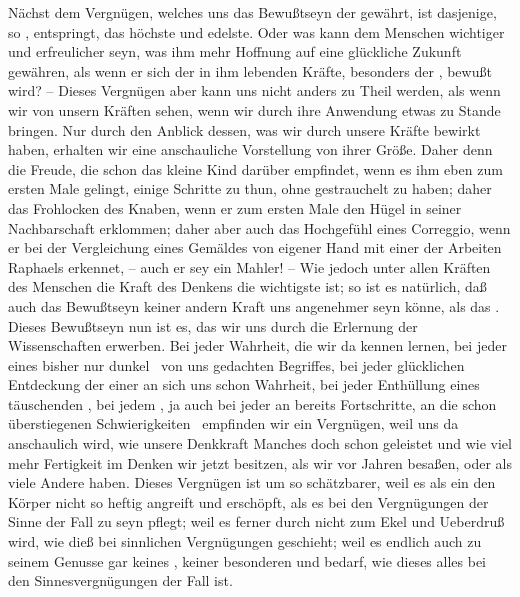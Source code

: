 \begin{aufza}
\begin{aufzb}
\item Nächst dem Vergnügen, welches uns das Bewußtseyn der  gewährt, ist dasjenige, so , entspringt, das höchste und edelste. Oder was kann dem Menschen wichtiger und erfreulicher seyn, was ihm mehr Hoffnung auf eine glückliche Zukunft gewähren, als wenn er sich der in ihm lebenden Kräfte, besonders der , bewußt wird? -- Dieses Vergnügen aber kann uns nicht anders zu Theil werden, als wenn wir  von unsern Kräften sehen, wenn wir durch ihre Anwendung etwas zu Stande bringen. Nur durch den Anblick dessen, was wir durch unsere Kräfte bewirkt haben, erhalten wir eine anschauliche Vorstellung von ihrer Größe. Daher denn die Freude, die schon das kleine Kind darüber empfindet, wenn es ihm eben zum ersten Male gelingt, einige Schritte zu thun, ohne gestrauchelt zu haben; daher das Frohlocken des Knaben, wenn er zum ersten Male den Hügel in seiner Nachbarschaft erklommen; daher aber auch das Hochgefühl eines Correggio, wenn er bei der Vergleichung eines Gemäldes von eigener Hand mit einer der Arbeiten Raphaels erkennet, -- auch er sey ein Mahler! -- Wie jedoch unter allen Kräften des Menschen die Kraft des Denkens die wichtigste ist; so ist es natürlich, daß auch das Bewußtseyn keiner andern Kraft uns angenehmer seyn könne, als das . Dieses Bewußtseyn nun ist es, das wir uns durch die Erlernung der Wissenschaften erwerben. Bei jeder  Wahrheit, die wir da kennen lernen, bei jeder  eines bisher nur dunkel~ von uns gedachten Begriffes, bei jeder glücklichen Entdeckung der  einer an sich uns schon  Wahrheit, bei jeder Enthüllung eines täuschenden , bei jedem , ja auch bei jeder  an bereits  Fortschritte, an die schon überstiegenen Schwierigkeiten \usw\ empfinden wir ein Vergnügen, weil uns da anschaulich wird, wie unsere Denkkraft Manches doch schon geleistet und wie viel mehr Fertigkeit im Denken wir jetzt besitzen, als wir vor Jahren besaßen, oder als viele Andere haben. Dieses Vergnügen ist um so schätzbarer, weil es als ein  den Körper nicht so heftig angreift und erschöpft, als es bei den Vergnügungen der Sinne der Fall zu seyn pflegt; weil es ferner durch  nicht zum Ekel und Ueberdruß wird, wie dieß bei sinnlichen Vergnügungen geschieht; weil es endlich auch zu seinem Genusse gar keines , keiner besonderen  und  bedarf, wie dieses alles bei den Sinnesvergnügungen der Fall ist.

\end{aufzb}
\end{aufza}
